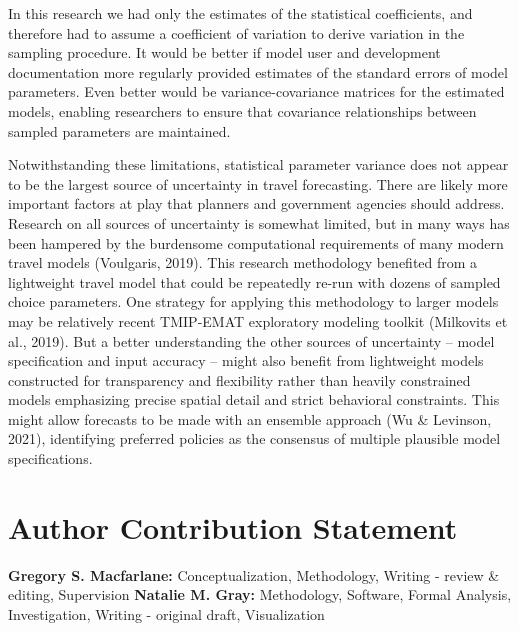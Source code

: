 \documentclass[
  letterpaper,
  authoryear,
  review,
  3p]{elsarticle}
\begin{document}
In this research we had only the estimates of the statistical
coefficients, and therefore had to assume a coefficient of variation to
derive variation in the sampling procedure. It would be better if model
user and development documentation more regularly provided estimates of
the standard errors of model parameters. Even better would be
variance-covariance matrices for the estimated models, enabling
researchers to ensure that covariance relationships between sampled
parameters are maintained.

Notwithstanding these limitations, statistical parameter variance does
not appear to be the largest source of uncertainty in travel
forecasting. There are likely more important factors at play that
planners and government agencies should address. Research on all sources
of uncertainty is somewhat limited, but in many ways has been hampered
by the burdensome computational requirements of many modern travel
models (Voulgaris, 2019). This research methodology benefited from a
lightweight travel model that could be repeatedly re-run with dozens of
sampled choice parameters. One strategy for applying this methodology to
larger models may be relatively recent TMIP-EMAT exploratory modeling
toolkit (Milkovits et al., 2019). But a better understanding the other
sources of uncertainty -- model specification and input accuracy --
might also benefit from lightweight models constructed for transparency
and flexibility rather than heavily constrained models emphasizing
precise spatial detail and strict behavioral constraints. This might
allow forecasts to be made with an ensemble approach (Wu \& Levinson,
2021), identifying preferred policies as the consensus of multiple
plausible model specifications.


\hypertarget{author-contribution-statement}{%
\section*{Author Contribution
Statement}\label{author-contribution-statement}}


\textbf{Gregory S. Macfarlane:} Conceptualization, Methodology, Writing
- review \& editing, Supervision \textbf{Natalie M. Gray:} Methodology,
Software, Formal Analysis, Investigation, Writing - original draft,
Visualization
\end{document}
